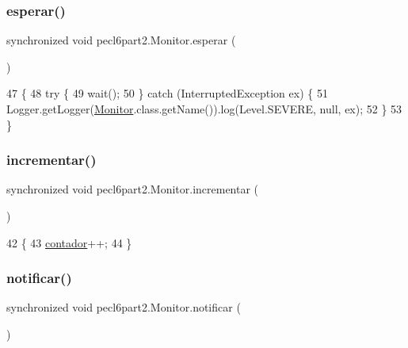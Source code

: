 \subsubsection{\texorpdfstring{esperar()}{esperar()}}
{\footnotesize\ttfamily synchronized void pecl6part2.\+Monitor.\+esperar (\begin{DoxyParamCaption}{ }\end{DoxyParamCaption})\hspace{0.3cm}{\ttfamily [inline]}}


\begin{DoxyCode}
47     \{
48         \textcolor{keywordflow}{try} \{
49             wait();
50         \} \textcolor{keywordflow}{catch} (InterruptedException ex) \{
51             Logger.getLogger(\mbox{\hyperlink{classpecl6part1_1_1_monitor}{Monitor}}.class.getName()).log(Level.SEVERE, null, ex);
52         \}
53     \}
\end{DoxyCode}
\mbox{\label{classpecl6part2_1_1_monitor_accec6614f7f330bda0ce5a47ec7ac502}} 
\subsubsection{\texorpdfstring{incrementar()}{incrementar()}}
{\footnotesize\ttfamily synchronized void pecl6part2.\+Monitor.\+incrementar (\begin{DoxyParamCaption}{ }\end{DoxyParamCaption})\hspace{0.3cm}{\ttfamily [inline]}}


\begin{DoxyCode}
42     \{
43         \mbox{\hyperlink{classpecl6part2_1_1_monitor_a0d9c747a36ef376665ed43b257c623ad}{contador}}++;
44     \}
\end{DoxyCode}
\mbox{\label{classpecl6part2_1_1_monitor_a77ff6dc9ee3ab70a9f20daea657d856b}} 
\subsubsection{\texorpdfstring{notificar()}{notificar()}}
{\footnotesize\ttfamily synchronized void pecl6part2.\+Monitor.\+notificar (\begin{DoxyParamCaption}{ }\end{DoxyParamCaption})\hspace{0.3cm}{\ttfamily [inline]}}



